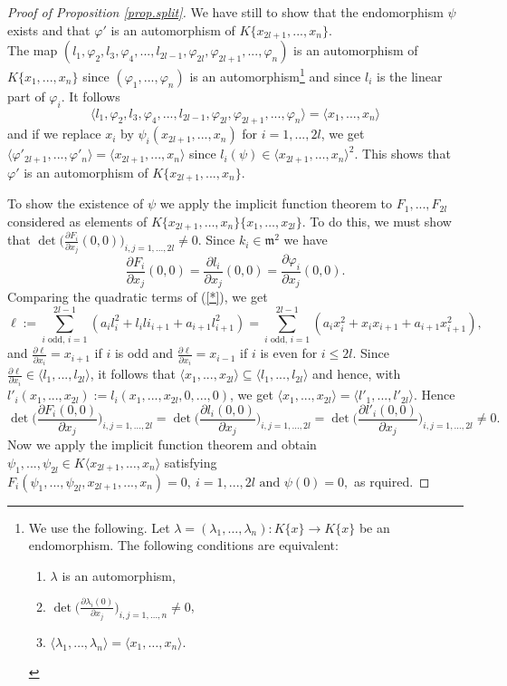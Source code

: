\documentclass[11pt]{article}
\newcommand{\fm}{\mathfrak{m}}
\begin{document}
\begin{proof}[Proof of Proposition \ref{prop.split}]
We have still to show that the endomorphism 
 $\psi$ exists and that $\varphi'$ is an automorphism of  $K\{x_{2l+1},...,x_n\}$.\\
The map $(l_1,\varphi_2, l_3,\varphi_4, ..., l_{2l-1},\varphi_{2l}, 
 \varphi_{2l+1},...,\varphi_{n})$ is an automorphism of \mbox{$K\{x_1,...,x_n\}$} since $(\varphi_1,...,\varphi_n)$ is an automorphism\footnote{We use the following. Let $\lambda=(\lambda_1,\ldots,\lambda_n):K\{x\}\longrightarrow K\{x\}$ be an endomorphism. The following conditions are equivalent:
 \begin{enumerate}
 \item $\lambda$ is an automorphism,
 \item $ \det \big ( \frac{\partial \lambda_i(0)}{\partial x_j}\big )_{i,j = 1,...,n} \ne 0$,
  \item  $\langle\lambda_1,\ldots,\lambda_n\rangle=\langle x_1,\ldots,x_n\rangle$.
  \end{enumerate}}
  and since $l_i$ is the linear part of $\varphi_i$.
 It follows 
 $$\langle l_1,\varphi_2, l_3,\varphi_4, ..., l_{2l-1},\varphi_{2l},  \varphi_{2l+1},...,\varphi_{n} \rangle = \langle x_{1} ,...,x_{n}\rangle$$
  and if we  replace $x_i$ by $\psi_i(x_{2l+1},...,x_n)$ for $i=1,...,2l$, we get 
  $\langle \varphi'_{2l+1},...,\varphi'_{n} \rangle = \langle x_{2l+1} ,...,x_{n}\rangle$ since $l_i(\psi)\in\langle x_{2l+1},\ldots,x_n\rangle^2$. This shows that $\varphi'$ is an automorphism of $K\{x_{2l+1},...,x_n\}$.
  
  To show the existence of $\psi$  we  apply the  implicit function theorem  to $F_1,...,F_{2l}$
  considered as elements of $K\{x_{2l+1},\ldots,x_n\}\{x_1,\ldots,x_{2l}\}$. To do this, we must show that \mbox{$\det \big ( \frac{\partial F_i}{\partial x_j} (0,0)\big )_{i,j = 1,...,2l}
  \ne 0$.} Since $k_i\in \fm^2$ we have 
  $$\frac{\partial F_i}{\partial x_j}(0,0)=\frac{\partial l_i}{\partial x_j}(0,0)=\frac{\partial \varphi_i}{\partial x_j}(0,0).$$
Comparing the quadratic terms of (\ref{*}), we get
 $$\ell:=\sum_{i \text{ odd, } i=1}^{2l-1}(a_i l_i^2 + l_ili_{i+1} +
a_{i+1} l_{i+1}^2 ) =
 \sum_{i \text{ odd, } i=1}^{2l-1}(a_i x_i^2 + x_ix_{i+1} +
a_{i+1} x_{i+1}^2),$$
 and $\frac{\partial \ell}{\partial x_i} = x_{i+1}$ if $i$ is odd and 
  $\frac{\partial \ell}{\partial x_i} = x_{i-1}$ if $i$ is even for $i \le 2l$. 
  Since $\frac{\partial \ell}{\partial x_i} \in \langle l_{1} ,...,l_{2l}\rangle$,
  it follows that $\langle x_{1} ,...,x_{2l}\rangle \subseteq \langle l_{1} ,...,l_{2l}\rangle$ and hence, with $l'_i(x_1,...,x_{2l}) 
  := l_i (x_{1} ,...,x_{2l},0,...,0)$, 
  we get $\langle x_{1} ,...,x_{2l}\rangle = \langle l'_{1} ,...,l'_{2l}\rangle$. Hence $$\det \big ( \frac{\partial F_i(0,0)}{\partial x_j}\big )_{i,j = 1,...,2l}=\det \big ( \frac{\partial l_i(0,0)}{\partial x_j}\big )_{i,j = 1,...,2l} = \det \big ( \frac{\partial l'_i(0,0)}{\partial x_j}\big )_{i,j = 1,...,2l} \ne 0.$$
  Now we apply the  implicit function theorem and obtain 
  $\psi_1,...,\psi_{2l} \in K\langle x_{2l+1},\ldots,x_n\rangle$ satisfying 
$F_i (\psi_1,...,\psi_{2l}, x_{2l+1},...,x_n)=0, \ i = 1,...,2l \text{ and } \psi(0)=0,$ as rquired.
\end{proof}
\end{document}
